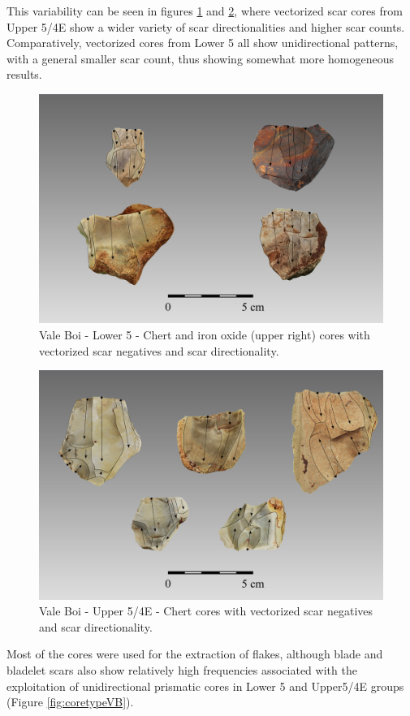 \documentclass[12pt,twoside]{reedthesis}
\begin{document}
This variability can be seen in figures \ref{fig:corelower} and \ref{fig:coreupper}, where vectorized scar cores from Upper 5/4E show a wider variety of scar directionalities and higher scar counts. Comparatively, vectorized cores from Lower 5 all show unidirectional patterns, with a general smaller scar count, thus showing somewhat more homogeneous results.
\begin{figure}

{\centering \includegraphics[width=0.8\linewidth]{figure/coreL} 

}

\caption{Vale Boi - Lower 5 - Chert and iron oxide (upper right) cores with vectorized scar negatives and scar directionality.}\label{fig:corelower}
\end{figure}
\begin{figure}

{\centering \includegraphics[width=0.8\linewidth]{figure/coreU} 

}

\caption{Vale Boi - Upper 5/4E - Chert cores with vectorized scar negatives and scar directionality.}\label{fig:coreupper}
\end{figure}
Most of the cores were used for the extraction of flakes, although blade and bladelet scars also show relatively high frequencies associated with the exploitation of unidirectional prismatic cores in Lower 5 and Upper5/4E groups (Figure \ref{fig:coretypeVB}).
\end{document}
